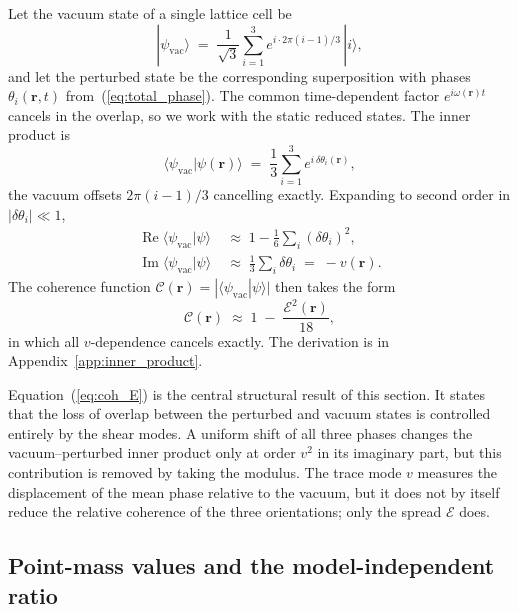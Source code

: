 \documentclass[a4paper,fleqn]{cas-dc}
\theoremstyle{thmstyleone}%
\theoremstyle{thmstyletwo}%
\begin{document}
Let the vacuum state of a single lattice cell be
\begin{equation}
    |\psi_{\mathrm{vac}}\rangle
    \;=\;
    \frac{1}{\sqrt{3}}
    \sum_{i=1}^{3}e^{i\cdot 2\pi(i-1)/3}\,|i\rangle,
    \label{eq:vac_state}
\end{equation}
and let the perturbed state be the corresponding superposition
with phases $\theta_i(\mathbf{r},t)$ from~(\ref{eq:total_phase}).
The common time-dependent factor $e^{i\omega(\mathbf{r})t}$
cancels in the overlap, so we work with the static reduced
states. The inner product is
\begin{equation}
    \langle\psi_{\mathrm{vac}}|\psi(\mathbf{r})\rangle
    \;=\;
    \frac{1}{3}\sum_{i=1}^{3}e^{i\,\delta\theta_i(\mathbf{r})},
    \label{eq:inner_exact}
\end{equation}
the vacuum offsets $2\pi(i-1)/3$ cancelling exactly. Expanding
to second order in $|\delta\theta_i|\ll 1$,
\begin{align}
    \operatorname{Re}\langle\psi_{\mathrm{vac}}|\psi\rangle
    &\;\approx\;
    1-\frac{1}{6}\sum_i(\delta\theta_i)^2, \label{eq:Re_part}\\
    \operatorname{Im}\langle\psi_{\mathrm{vac}}|\psi\rangle
    &\;\approx\;
    \frac{1}{3}\sum_i\delta\theta_i
    \;=\;
    -v(\mathbf{r}).
    \label{eq:Im_part}
\end{align}
The coherence function
$\mathcal{C}(\mathbf{r})=|\langle\psi_{\mathrm{vac}}|\psi
\rangle|$ then takes the form
\begin{equation}
    \mathcal{C}(\mathbf{r})
    \;\approx\;
    1\;-\;\frac{\mathcal{E}^2(\mathbf{r})}{18},
    \label{eq:coh_E}
\end{equation}
in which all $v$-dependence cancels exactly. The derivation is
in Appendix~\ref{app:inner_product}.

Equation~(\ref{eq:coh_E}) is the central structural result of
this section. It states that the loss of overlap between
the perturbed and vacuum states is controlled entirely by the
shear modes. A uniform shift of all three phases changes the
vacuum--perturbed inner product only at order $v^2$ in its
imaginary part, but this contribution is removed by taking the
modulus. The trace mode $v$ measures the displacement of the
mean phase relative to the vacuum, but it does not by itself
reduce the relative coherence of the three orientations; only
the spread $\mathcal{E}$ does.

\subsection{Point-mass values and the model-independent ratio}
\end{document}
